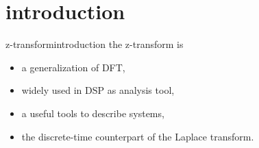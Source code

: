 


\subtitle{Part 16: z-transform}


	

\section[intro]{introduction}
	\begin{frame}{z-transform}{introduction}
        the z-transform is
        \begin{itemize}
            \item   a generalization of DFT,
            \item   widely used in DSP as analysis tool,
            \item   a useful tools to describe systems,
            \item   the discrete-time counterpart of the Laplace transform.
        \end{itemize}
	\end{frame}

